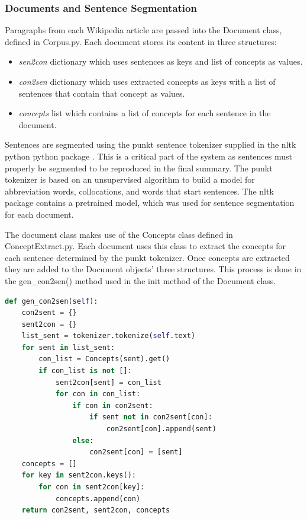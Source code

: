 \subsubsection{Documents and Sentence Segmentation}
Paragraphs from each Wikipedia article are passed into the Document class, defined in Corpus.py. Each document stores its content in three structures:
\begin{itemize}
    \item \emph{sen2con} dictionary which uses sentences as keys and list of concepts as values.
    \item \emph{con2sen} dictionary which uses extracted concepts as keys with a list of sentences that contain that concept as values.
    \item \emph{concepts} list which contains a list of concepts for each sentence in the document.
\end{itemize}
Sentences are segmented using the punkt sentence tokenizer \citep{kiss2006unsupervised} supplied in the nltk python python package \citep{bird2009natural}. This is a critical part of the system as sentences must properly be segmented to be reproduced in the final summary. The punkt tokenizer is based on an unsupervised algorithm to build a model for abbreviation words, collocations, and words that start sentences. The nltk package contains a pretrained model, which was used for sentence segmentation for each document. 

The document class makes use of the Concepts class defined in ConceptExtract.py. Each document uses this class to extract the concepts for each sentence determined by the punkt tokenizer. Once concepts are extracted they are added to the Document objects' three structures. This process is done in the gen\_con2sen() method used in the init method of the Document class.

\begin{lstlisting}[language=Python]
def gen_con2sen(self):
    con2sent = {}
    sent2con = {}
    list_sent = tokenizer.tokenize(self.text)
    for sent in list_sent:
        con_list = Concepts(sent).get()
        if con_list is not []:
            sent2con[sent] = con_list
            for con in con_list:
                if con in con2sent:
                    if sent not in con2sent[con]:
                        con2sent[con].append(sent)
                else:
                    con2sent[con] = [sent]
    concepts = []
    for key in sent2con.keys():
        for con in sent2con[key]:
            concepts.append(con)
    return con2sent, sent2con, concepts
\end{lstlisting}

